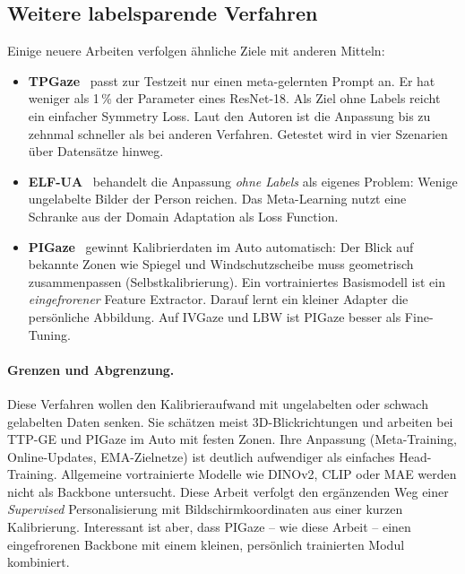 \subsection{Weitere labelsparende Verfahren}
\label{subsec:tta_weitere}
Einige neuere Arbeiten verfolgen ähnliche Ziele mit anderen Mitteln:
\begin{itemize}
  \item \textbf{TPGaze}~\cite{liu2024tpgaze} passt zur Testzeit nur einen
        meta-gelernten Prompt an. Er hat weniger als 1\,\% der Parameter eines
        ResNet-18. Als Ziel ohne Labels reicht ein einfacher Symmetry Loss.
        Laut den Autoren ist die Anpassung bis zu zehnmal schneller als bei
        anderen Verfahren. Getestet wird in vier Szenarien über Datensätze
        hinweg.
  \item \textbf{ELF-UA}~\cite{wu2024elfua} behandelt die Anpassung
        \emph{ohne Labels} als eigenes Problem: Wenige ungelabelte Bilder der
        Person reichen. Das Meta-Learning nutzt eine Schranke aus der
        Domain Adaptation als Loss Function.
  \item \textbf{PIGaze}~\cite{wang2026pigaze} gewinnt Kalibrierdaten im Auto
        automatisch: Der Blick auf bekannte Zonen wie Spiegel und
        Windschutzscheibe muss geometrisch zusammenpassen
        (Selbstkalibrierung). Ein vortrainiertes Basismodell ist ein
        \emph{eingefrorener} Feature Extractor. Darauf lernt ein kleiner
        Adapter die persönliche Abbildung. Auf IVGaze und LBW ist PIGaze
        besser als Fine-Tuning.
\end{itemize}

\paragraph{Grenzen und Abgrenzung.}
Diese Verfahren wollen den Kalibrieraufwand mit ungelabelten oder schwach
gelabelten Daten senken. Sie schätzen meist 3D-Blickrichtungen und arbeiten bei
TTP-GE und PIGaze im Auto mit festen Zonen. Ihre Anpassung (Meta-Training,
Online-Updates, EMA-Zielnetze) ist deutlich aufwendiger als einfaches
Head-Training. Allgemeine vortrainierte Modelle wie DINOv2, CLIP oder MAE werden
nicht als Backbone untersucht. Diese Arbeit verfolgt den ergänzenden Weg einer
\emph{Supervised} Personalisierung mit Bildschirmkoordinaten aus einer kurzen
Kalibrierung. Interessant ist aber, dass PIGaze -- wie diese Arbeit -- einen
eingefrorenen Backbone mit einem kleinen, persönlich trainierten Modul
kombiniert.


